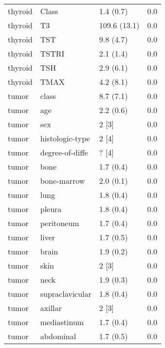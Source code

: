\begin{tabular}{lllr}
thyroid & Class & 1.4 (0.7) & 0.0 \\
thyroid & T3 & 109.6 (13.1) & 0.0 \\
thyroid & TST & 9.8 (4.7) & 0.0 \\
thyroid & TSTRI & 2.1 (1.4) & 0.0 \\
thyroid & TSH & 2.9 (6.1) & 0.0 \\
thyroid & TMAX & 4.2 (8.1) & 0.0 \\
tumor & class & 8.7 (7.1) & 0.0 \\
tumor & age & 2.2 (0.6) & 0.0 \\
tumor & sex & 2 [3] & 0.0 \\
tumor & histologic-type & 2 [4] & 0.0 \\
tumor & degree-of-diffe & ? [4] & 0.0 \\
tumor & bone & 1.7 (0.4) & 0.0 \\
tumor & bone-marrow & 2.0 (0.1) & 0.0 \\
tumor & lung & 1.8 (0.4) & 0.0 \\
tumor & pleura & 1.8 (0.4) & 0.0 \\
tumor & peritoneum & 1.7 (0.4) & 0.0 \\
tumor & liver & 1.7 (0.5) & 0.0 \\
tumor & brain & 1.9 (0.2) & 0.0 \\
tumor & skin & 2 [3] & 0.0 \\
tumor & neck & 1.9 (0.3) & 0.0 \\
tumor & supraclavicular & 1.8 (0.4) & 0.0 \\
tumor & axillar & 2 [3] & 0.0 \\
tumor & mediastinum & 1.7 (0.4) & 0.0 \\
tumor & abdominal & 1.7 (0.5) & 0.0 \\
\bottomrule
\end{tabular}
